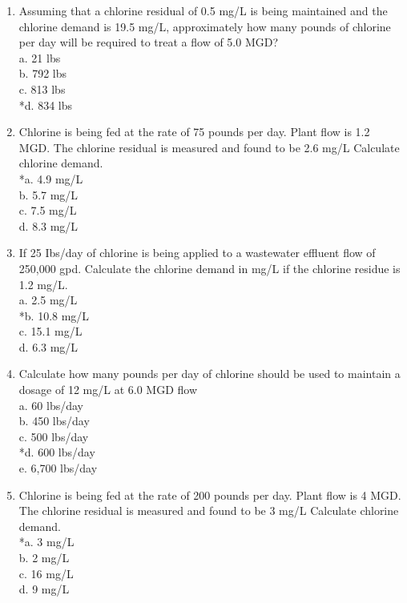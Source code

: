 \documentclass{article}
\begin{document}
\begin{enumerate}
\item Assuming that a chlorine residual of 0.5 mg/L is being maintained and the chlorine demand is 19.5 mg/L, approximately how many pounds of chlorine per day will be required to treat a flow of 5.0 MGD?\\

a. 21 lbs \\
b. 792 lbs \\
c. 813 lbs \\
*d. 834 lbs 


\item Chlorine is being fed at the rate of 75 pounds per day. Plant flow is 1.2 MGD. The chlorine residual is measured and found to be 2.6 mg/L Calculate chlorine demand.\\
*a. 4.9 mg/L \\
b. 5.7 mg/L \\
c. 7.5 mg/L \\
d. 8.3 mg/L 


\item If 25 Ibs/day of chlorine is being applied to a wastewater effluent flow of 250,000 gpd. Calculate the chlorine demand in mg/L if the chlorine residue is 1.2 mg/L.\\
a. 2.5 mg/L \\
*b. 10.8 mg/L \\
c. 15.1 mg/L \\
d. 6.3 mg/L \\


\item Calculate how many pounds per day of chlorine should be used to maintain a dosage of 12 mg/L at 6.0 MGD flow\\

a. 60 lbs/day \\
b. 450 lbs/day \\
c. 500 lbs/day \\
*d. 600 lbs/day \\
e. 6,700 lbs/day 

\item Chlorine is being fed at the rate of 200 pounds per day. Plant flow is 4 MGD. The chlorine residual is measured and found to be 3 mg/L Calculate chlorine demand.\\

\vspace{0.5cm}
*a. 3 mg/L \\
b. 2 mg/L \\
c. 16 mg/L \\
d. 9 mg/L \\


\end{enumerate}
\end{document}
